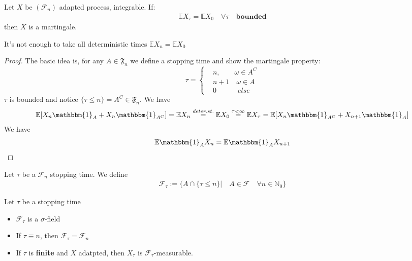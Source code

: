 \begin{theorem}\label{Q2.1}
	Let $X$ be $(\mathcal{F}_n)$ adapted process, integrable. If:
	\begin{align*}
		\mathbb{E} X_\tau = \mathbb{E}X_0 \quad \forall \tau \quad \textbf{bounded}
	\end{align*}
	then $X$ is a martingale.
\end{theorem}
\begin{remark}
It's not enough to take all deterministic times	$\mathbb{E}X_n = \mathbb{E}X_0$
\end{remark}
\begin{proof}
The basic idea is, for any  $A \in \mathfrak{F}_{n}$ we define a stopping time and show the martingale property:
	\begin{equation*}
		\tau = \left\{
		\begin{aligned}
			&n, \qquad \omega \in A^C\\
			&n+1 \quad \omega \in  A\\
			&0 \quad \qquad else
		\end{aligned}
		\right.
	\end{equation*}
	$\tau$ is bounded and notice $\{\tau \le n\} = A^C \in \mathfrak{F}_n$. We have
	\begin{align*}
		\mathbb{E}[X_n\mathbbm{1}_{A} + X_n\mathbbm{1}_{A^C}]= \mathbb{E}X_n\overset{deter.st.}{=}
		\mathbb{E}X_0 \overset{\tau< \infty}{= } \mathbb{E}X_\tau = \mathbb{E}[X_n\mathbbm{1}_{A^C} + X_{n+1}\mathbbm{1}_{A}]
	\end{align*}
	We have
	\begin{align*}
		\mathbb{E}\mathbbm{1}_{A} X_n = \mathbb{E}\mathbbm{1}_{A}X_{n+1}
	\end{align*}
\end{proof}

\begin{definition}
	Let $\tau$ be a $\mathcal{F}_n$ stopping time. We define
	\begin{align*}
		\mathcal{F}_\tau:= \bigg \{ A \cap \{\tau \leq n \}|\quad A \in \mathcal{F} \quad \forall n \in \mathbb{N}_0 \bigg\}
	\end{align*}
\end{definition}

\begin{lemma}
	Let $\tau$ be a stopping time
	\begin{itemize}
		\item $\mathcal{F}_\tau$ is a $\sigma$-field
		\item If $\tau \equiv n$, then $\mathcal{F}_\tau = \mathcal{F}_n$
		\item If $\tau$ is \textbf{finite} and $X$ adatpted, then $X_\tau$ is $\mathcal{F}_\tau$-measurable.
	\end{itemize}
\end{lemma}

